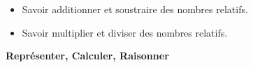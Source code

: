 \begin{myobj}
	\begin{itemize}
		
		\item Savoir additionner et soustraire des nombres relatifs.
		\item Savoir multiplier et diviser des nombres relatifs.
			
	\end{itemize}
\end{myobj}


\begin{mycomp}
	\textbf{Représenter, Calculer, Raisonner}
\end{mycomp}


